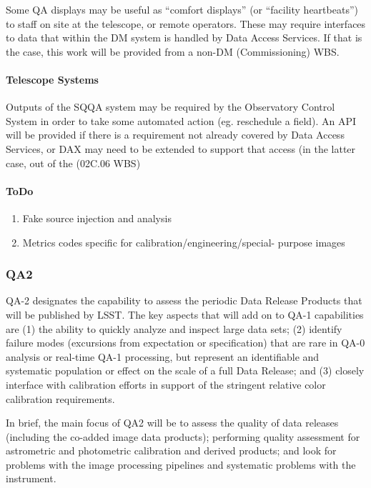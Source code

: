 Some QA displays may be useful as ``comfort displays'' (or ``facility heartbeats'') to staff on site at the telescope, or remote operators. These may require interfaces to data that within the DM system is handled by Data Access Services. If that is the case, this work will be provided from a non-DM (Commissioning) WBS.

\paragraph{Telescope Systems}
\label{sec:qaTelescopeSystem}

Outputs of the SQQA system may be required by the Observatory Control
System in order to take some automated action (eg. reschedule a
field). An API will be provided if there is a requirement not already
covered by Data Access Services, or DAX may need to be extended to support that access (in the latter case, out of the (02C.06 WBS)

\paragraph{ToDo}

\begin{enumerate}

\item Fake source injection and analysis


\item Metrics codes specific for calibration/engineering/special- purpose images
\end{enumerate}

\subsubsection{QA2}
QA-2 designates the capability to assess the periodic Data Release Products that will be published by LSST.  The key aspects that will add on to QA-1 capabilities are (1) the ability to quickly analyze and inspect large data sets; (2) identify failure modes (excursions from expectation or specification) that are rare in QA-0 analysis or real-time QA-1 processing, but represent an identifiable and systematic population or effect on the scale of a full Data Release; and (3) closely interface with calibration efforts in support of the stringent relative color calibration requirements.

In brief, the main focus of QA2 will be to assess the quality of data releases (including the co-added image data products); performing quality assessment for astrometric and photometric calibration and derived products; and look for problems with the image processing pipelines and systematic problems with the instrument.

